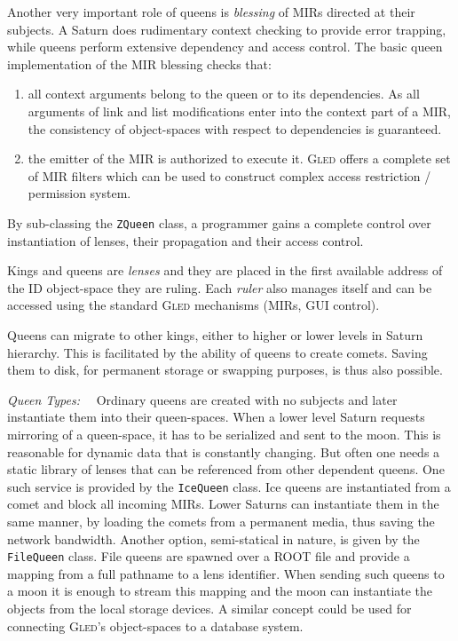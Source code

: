 \documentclass[a4paper,11pt]{article}
\def\gled{\textsc{Gled}\xspace}
\def\smalltt#1{{\small\texttt{#1}}}
\begin{document}
Another very important role of queens is \emph{blessing} of MIRs
directed at their subjects. A Saturn does rudimentary context checking
to provide error trapping, while queens perform extensive dependency
and access control. The basic queen implementation of the MIR blessing
checks that:
\begin{enumerate}
\item all context arguments belong to the queen or to its
dependencies. As all arguments of link and list modifications enter
into the context part of a MIR, the consistency of object-spaces with
respect to dependencies is guaranteed.
\item the emitter of the MIR is authorized to execute it. 
  \gled offers a complete set of MIR filters which can be used to
  construct complex access restriction / permission system.
\end{enumerate}
By sub-classing the
\smalltt{ZQueen} class, a programmer gains a complete control over
instantiation of lenses, their propagation and their access control.

Kings and queens are \emph{lenses} and they are placed in the first
available address of the ID object-space they are ruling. Each
\emph{ruler} also manages itself and can be accessed using the
standard \gled mechanisms (MIRs, GUI control).

Queens can migrate to other kings, either to higher or lower levels in
Saturn hierarchy. This is facilitated by the ability of queens to
create comets. Saving them to disk, for permanent storage or swapping
purposes, is thus also possible.

\emph{Queen Types:}\ \ 
Ordinary queens are created with no subjects and later instantiate
them into their queen-spaces. When a lower level Saturn requests
mirroring of a queen-space, it has to be serialized and sent to the
moon. This is reasonable for dynamic data that is constantly changing.
But often one needs a static library of lenses that can be
referenced from other dependent queens. One such service is provided
by the \smalltt{IceQueen} class. Ice queens are instantiated from a
comet and block all incoming MIRs. Lower Saturns can instantiate them
in the same manner, by loading the comets from a permanent media, thus
saving the network bandwidth. Another option, semi-statical in
nature, is given by the \smalltt{FileQueen} class. File queens are
spawned over a ROOT file and provide a mapping from a full pathname to
a lens identifier. When sending such queens to a moon it is enough to
stream this mapping and the moon can instantiate the objects from the
local storage devices. A similar concept could be used for
connecting \gled's object-spaces to a database system.
\end{document}
